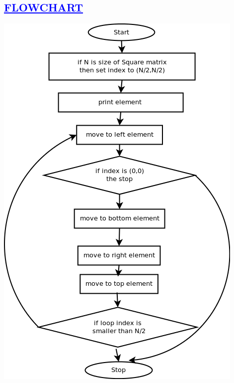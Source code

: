 \documentclass[a4paper,12pt]{report}
\begin{document}
\begin{center}
\chapter{\textcolor{blue}{\underline {FLOWCHART}}}


 \includegraphics[width=15 cm,height=15 cm]{./flowchart1.png}
\end{center}
\end{document}

